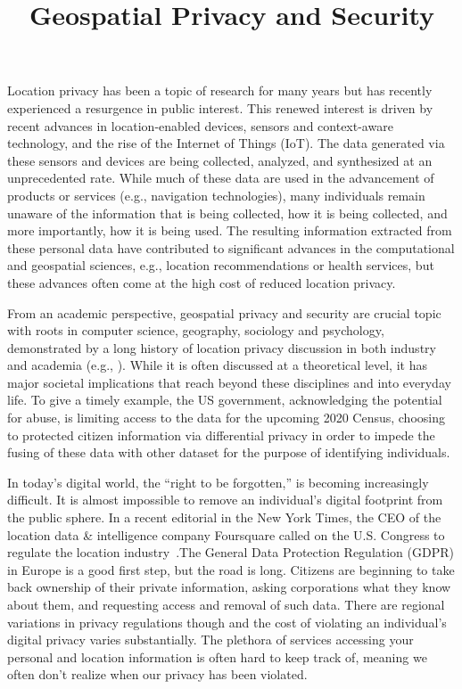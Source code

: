 \documentclass{josised}
\begin{document}

\title{Geospatial Privacy and Security}

\maketitle

	\thispagestyle{titlepage}

Location privacy has been a topic of research for many years but has recently experienced a resurgence in public interest. This renewed interest is driven by recent advances in location-enabled devices, sensors and context-aware technology, and the rise of the Internet of Things (IoT). The data generated via these sensors and devices are being collected, analyzed, and synthesized at an unprecedented rate. While much of these data are used in the advancement of products or services (e.g., navigation technologies), many individuals remain unaware of the information that is being collected, how it is being collected, and more importantly, how it is being used. The resulting information extracted from these personal data have contributed to significant advances in the computational and geospatial sciences, e.g., location recommendations or health services, but these advances often come at the high cost of reduced location privacy. 

From an academic perspective, geospatial privacy and security are crucial topic with roots in computer science, geography, sociology and psychology, demonstrated by a long history of location privacy discussion in both industry and academia (e.g., \cite{dobson2003geoslavery,duckham2005formal,krumm2009survey,armstrong2005geographic,kessler2018geoprivacy}).  While it is often discussed at a theoretical level, it has major societal implications that reach beyond these disciplines and into everyday life. To give a timely example, the US government, acknowledging the potential for abuse, is limiting access to the data for the upcoming 2020 Census, choosing to protected citizen information via differential privacy in order to impede the fusing of these data with other dataset for the purpose of identifying individuals.

In today’s digital world, the ``right to be forgotten,'' is becoming increasingly difficult. It is almost impossible to remove an individual’s digital footprint from the public sphere. In a recent editorial in the New York Times, the CEO of the location data \& intelligence company Foursquare called on the U.S. Congress to regulate the location industry~\cite{glueck2019}.The General Data Protection Regulation (GDPR) in Europe is a good first step, but the road is long.  Citizens are beginning to take back ownership of their private information, asking corporations what they know about them, and requesting access and removal of such data. There are regional variations in privacy regulations though and the cost of violating an individual’s digital privacy varies substantially.  The plethora of services accessing your personal and location information is often hard to keep track of, meaning we often don’t realize when our privacy has been violated.
\end{document}
